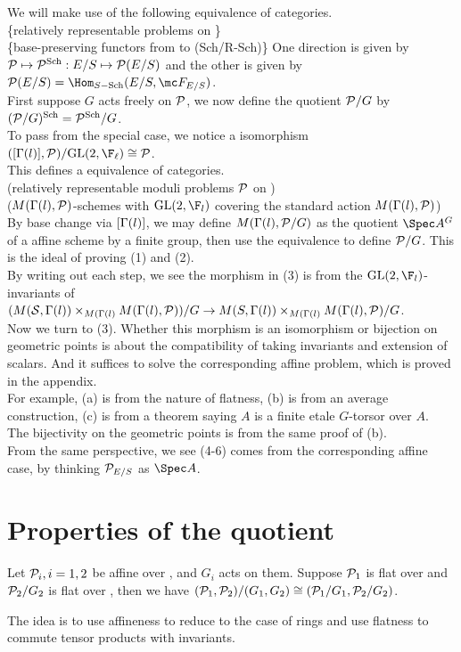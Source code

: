 We will make use of the following equivalence of categories. \\
\{relatively representable problems on \ellr\} \\
\{base-preserving functors from \ellr to (Sch/R-Sch)\}
One direction is given by $\mathcal{P}\mapsto \mathcal{P}^{\text{Sch}}: E/S \mapsto \mathcal{P}(E/S)$ and the other is given by $\cP(E/S)=\Hom_{S-\text{Sch}}(E/S, \mc F_{E/S})$. \\
First suppose $G$ acts freely on $\mathcal{P}$, we now define the quotient $\mathcal{P}/G$ by $(\mathcal{P}/G)^{\text{Sch}} = \mathcal{P}^{\text{Sch}}/G$. \\
To pass from the special case, we notice a isomorphism $(\gl,\cP)/\text{GL}(2,\F_\ell) \cong \cP$. \\
This defines a equivalence of categories. \\
(relatively representable moduli problems $\mathcal{P}$ on \ellr) \\
($M(\Gamma(l),\mathcal{P})$-schemes with $\text{GL}(2,\F_l)$ covering the standard action $M(\Gamma(l),\mathcal{P})$)\\
By base change via $[\Gamma(l)]$, we may define $M(\Gamma(l),\mathcal{P}/G)$ as the quotient $\Spec A^G$ of a affine scheme by a finite group, then use the equivalence to define $\mathcal{P}/G$. This is the ideal of proving (1) and (2). \\
By writing out each step, we see the morphism in (3) is from the $\text{GL}(2,\F_l)$-invariants of $(M(\mathcal{S},\Gamma(l))\times_{M(\Gamma(l)} M(\Gamma(l),\mathcal{P}))/G\to M(S,\Gamma(l))\times_{M(\Gamma(l)} M(\Gamma(l),\mathcal{P})/G$. \\
Now we turn to (3).
Whether this morphism is an isomorphism or bijection on geometric points is about the compatibility of taking invariants and extension of scalars. And it suffices to solve the corresponding affine problem, which is proved in the appendix. \\

For example, (a) is from the nature of flatness, (b) is from an average construction, (c) is from a theorem saying $A$ is a finite etale $G$-torsor over $A$.\\
The bijectivity on the geometric points is from the same proof of (b). \\
From the same perspective, we see (4-6) comes from the corresponding affine case, by thinking $\mathcal{P}_{E/S}$ as $\Spec A$. \\
\section{Properties of the quotient}
\begin{proposition}
	Let $\mathcal{P}_i, i=1,2$ be affine over \ellr, and $G_i$ acts on them. Suppose $\mathcal{P}_1$ is flat over \ellr and $\mathcal{P}_2/G_2$ is flat over \ellr, then we have $(\mathcal{P}_1,\mathcal{P}_2)/(G_1,G_2)\cong (\mathcal{P}_1/G_1,\mathcal{P}_2/G_2)$.
\end{proposition}
The idea is to use affineness to reduce to the case of rings and use flatness to commute tensor products with invariants. \\
